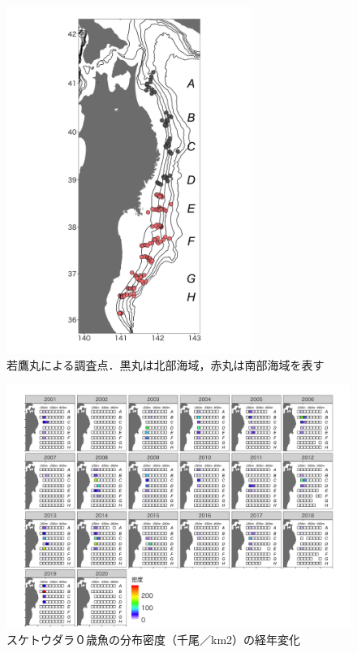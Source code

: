 \documentclass[11pt]{article} %
\begin{document}
\begin{linenumbers}
\begin{figure}[h]
  \centering
  \includegraphics[width = 8cm]{fig1.png}
  \caption{若鷹丸による調査点．黒丸は北部海域，赤丸は南部海域を表す}
\end{figure}

\begin{figure}[h]
  \centering
  \includegraphics[width = 14cm]{スケトウダラ０＋dens.png}
  \caption{スケトウダラ０歳魚の分布密度（千尾／km2）の経年変化}
\end{figure}


\end{linenumbers}
\end{document}
